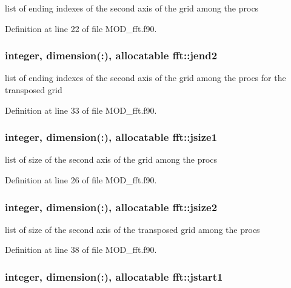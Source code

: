 list of ending indexes of the second axis of the grid among the procs 



Definition at line 22 of file M\-O\-D\-\_\-fft.\-f90.

\hypertarget{classfft_adf475ffd3fdc36883f33b56407809a4a}{
\subsubsection[{jend2}]{\setlength{\rightskip}{0pt plus 5cm}integer, dimension(\-:), allocatable fft\-::jend2}}\label{classfft_adf475ffd3fdc36883f33b56407809a4a}


list of ending indexes of the second axis of the grid among the procs for the transposed grid 



Definition at line 33 of file M\-O\-D\-\_\-fft.\-f90.

\hypertarget{classfft_aff713d4158514d9c4471f31c97884d52}{
\subsubsection[{jsize1}]{\setlength{\rightskip}{0pt plus 5cm}integer, dimension(\-:), allocatable fft\-::jsize1}}\label{classfft_aff713d4158514d9c4471f31c97884d52}


list of size of the second axis of the grid among the procs 



Definition at line 26 of file M\-O\-D\-\_\-fft.\-f90.

\hypertarget{classfft_a8f1f76f94641eff9c7ab779c8e04e49c}{
\subsubsection[{jsize2}]{\setlength{\rightskip}{0pt plus 5cm}integer, dimension(\-:), allocatable fft\-::jsize2}}\label{classfft_a8f1f76f94641eff9c7ab779c8e04e49c}


list of size of the second axis of the transposed grid among the procs 



Definition at line 38 of file M\-O\-D\-\_\-fft.\-f90.

\hypertarget{classfft_ab253fc8733e246ba7dcb5f806ef1c439}{
\subsubsection[{jstart1}]{\setlength{\rightskip}{0pt plus 5cm}integer, dimension(\-:), allocatable fft\-::jstart1}}\label{classfft_ab253fc8733e246ba7dcb5f806ef1c439}


